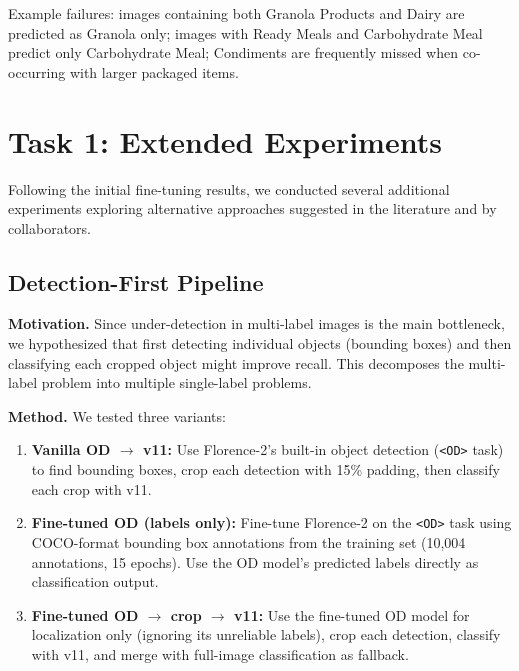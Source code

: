 \documentclass[11pt]{article}
\begin{document}
Example failures: images containing both Granola Products and Dairy are predicted as Granola only; images with Ready Meals and Carbohydrate Meal predict only Carbohydrate Meal; Condiments are frequently missed when co-occurring with larger packaged items.

\section{Task 1: Extended Experiments}
\label{sec:task1_extended}

Following the initial fine-tuning results, we conducted several additional experiments exploring alternative approaches suggested in the literature and by collaborators.

\subsection{Detection-First Pipeline}

\textbf{Motivation.} Since under-detection in multi-label images is the main bottleneck, we hypothesized that first detecting individual objects (bounding boxes) and then classifying each cropped object might improve recall. This decomposes the multi-label problem into multiple single-label problems.

\textbf{Method.} We tested three variants:
\begin{enumerate}[nosep,leftmargin=1.5em]
  \item \textbf{Vanilla OD $\rightarrow$ v11:} Use Florence-2's built-in object detection (\texttt{<OD>} task) to find bounding boxes, crop each detection with 15\% padding, then classify each crop with v11.
  \item \textbf{Fine-tuned OD (labels only):} Fine-tune Florence-2 on the \texttt{<OD>} task using COCO-format bounding box annotations from the training set (10,004 annotations, 15 epochs). Use the OD model's predicted labels directly as classification output.
  \item \textbf{Fine-tuned OD $\rightarrow$ crop $\rightarrow$ v11:} Use the fine-tuned OD model for localization only (ignoring its unreliable labels), crop each detection, classify with v11, and merge with full-image classification as fallback.
\end{enumerate}
\end{document}
